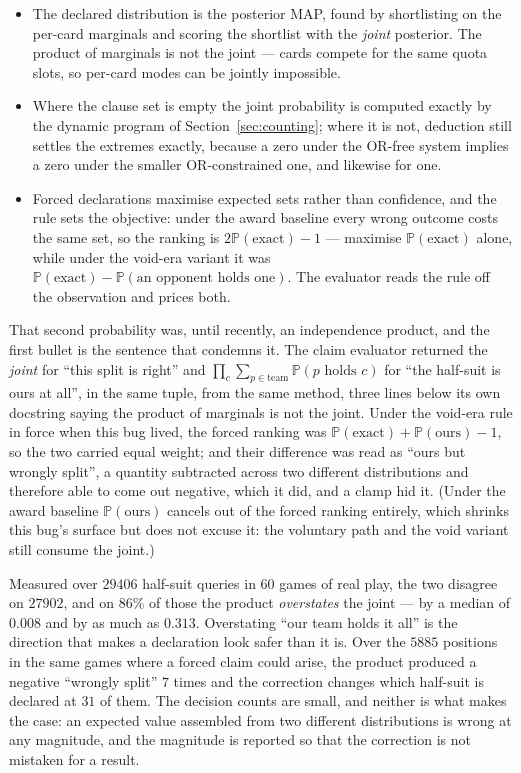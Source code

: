 \documentclass[11pt,letterpaper]{article}
\newcommand{\Prob}{\ensuremath{\mathbb{P}}}
\begin{document}
\begin{itemize}
\item The declared distribution is the posterior MAP, found by shortlisting on
the per-card marginals and scoring the shortlist with the \emph{joint}
posterior. The product of marginals is not the joint --- cards compete for the
same quota slots, so per-card modes can be jointly impossible.
\item Where the clause set is empty the joint probability is computed exactly by
the dynamic program of Section~\ref{sec:counting}; where it is not, deduction
still settles the extremes exactly, because a zero under the OR-free system
implies a zero under the smaller OR-constrained one, and likewise for one.
\item Forced declarations maximise expected sets rather than confidence, and
the rule sets the objective: under the award baseline every wrong outcome
costs the same set, so the ranking is $2\Prob(\text{exact}) - 1$ ---
maximise $\Prob(\text{exact})$ alone, while under the void-era variant it
was $\Prob(\text{exact}) - \Prob(\text{an opponent holds one})$. The
evaluator reads the rule off the observation and prices both.
\end{itemize}

That second probability was, until recently, an independence product, and the
first bullet is the sentence that condemns it. The claim evaluator returned the
\emph{joint} for ``this split is right'' and $\prod_c \sum_{p \in
\text{team}} \Prob(p \text{ holds } c)$ for ``the half-suit is ours at all'', in
the same tuple, from the same method, three lines below its own docstring
saying the product of marginals is not the joint. Under the void-era rule in
force when this bug lived, the forced ranking was $\Prob(\text{exact}) +
\Prob(\text{ours}) - 1$, so the two carried equal weight; and their
difference was read as ``ours but wrongly split'', a quantity subtracted
across two different distributions and therefore able to come out negative,
which it did, and a clamp hid it. (Under the award baseline
$\Prob(\text{ours})$ cancels out of the forced ranking entirely, which
shrinks this bug's surface but does not excuse it: the voluntary path and
the void variant still consume the joint.)

Measured over $29406$ half-suit queries in $60$ games of real play, the two
disagree on $27902$, and on $86\%$ of those the product \emph{overstates} the
joint --- by a median of $0.008$ and by as much as $0.313$. Overstating ``our
team holds it all'' is the direction that makes a declaration look safer than
it is. Over the $5885$ positions in the same games where a forced claim could
arise, the product produced a negative ``wrongly split'' $7$ times and the
correction changes which half-suit is declared at $31$ of them. The decision
counts are small, and neither is what makes the case: an expected value
assembled from two different distributions is wrong at any magnitude, and the
magnitude is reported so that the correction is not mistaken for a result.
\end{document}
